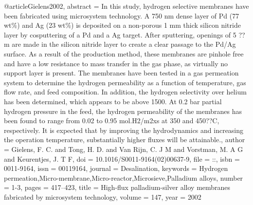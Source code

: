 @article{Gielens2002,
abstract = {In this study, hydrogen selective membranes have been fabricated using microsystem technology. A 750 nm dense layer of Pd (77 wt{\%}) and Ag (23 wt{\%}) is deposited on a non-porous 1 mm thick silicon nitride layer by cosputtering of a Pd and a Ag target. After sputtering, openings of 5 ??m are made in the silicon nitride layer to create a clear passage to the Pd/Ag surface. As a result of the production method, these membranes are pinhole free and have a low resistance to mass transfer in the gas phase, as virtually no support layer is present. The membranes have been tested in a gas permeation system to determine the hydrogen permeability as a function of temperature, gas flow rate, and feed composition. In addition, the hydrogen selectivity over helium has been determined, which appears to be above 1500. At 0.2 bar partial hydrogen pressure in the feed, the hydrogen permeability of the membranes has been found to range from 0.02 to 0.95 mol.H2/m2xs at 350 and 450??C, respectively. It is expected that by improving the hydrodynamics and increasing the operation temperature, substantially higher fluxes will be attainable.},
author = {Gielens, F. C. and Tong, H. D. and {Van Rijn}, C. J M and Vorstman, M. A G and Keurentjes, J. T F},
doi = {10.1016/S0011-9164(02)00637-9},
file = {::},
isbn = {0011-9164},
issn = {00119164},
journal = {Desalination},
keywords = {Hydrogen permeation,Micro-membrane,Micro-reactor,Microsieve,Palladium alloys},
number = {1-3},
pages = {417--423},
title = {{High-flux palladium-silver alloy membranes fabricated by microsystem technology}},
volume = {147},
year = {2002}
}

